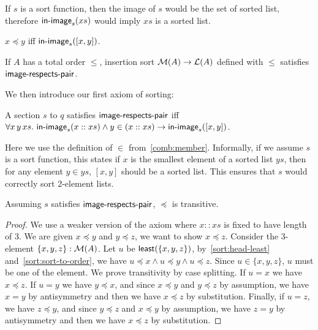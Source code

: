 If $s$ is a sort function, then the image of $s$ would be the set of sorted list, therefore
$\operatorname{\mathsf{in-image}}_s(xs)$ would imply $xs$ is a sorted list.

\begin{proposition}\label{sort:sort-to-order}
    $x \preccurlyeq y$ iff $\operatorname{\mathsf{in-image}}_s([x, y])$.
\end{proposition}

\begin{proposition}
    If $A$ has a total order $\leq$, insertion sort $\mathcal{M}(A) \to \mathcal{L}(A)$ defined with $\leq$
    satisfies $\operatorname{\mathsf{image-respects-pair}}$.
\end{proposition}

\noindent
We then introduce our first axiom of sorting:
\begin{definition}\label{sort:head-least}
    A section $s$ to $q$ satisfies $\operatorname{\mathsf{image-respects-pair}}$ iff
    $\forall x\, y\, xs.\, \operatorname{\mathsf{in-image}}_s(x :: xs) \land y \in (x :: xs) \to \operatorname{\mathsf{in-image}}_s([x,y])$.
\end{definition}
Here we use the definition of $\in$ from~\ref{comb:member}. Informally,
if we assume $s$ is a sort function, this states if
$x$ is the smallest element of a sorted list $ys$, then for any element $y \in ys$,
$[x, y]$ should be a sorted list. This ensures that $s$ would correctly sort 2-element lists.

\begin{proposition}
    Assuming $s$ satisfies $\operatorname{\mathsf{image-respects-pair}}$, $\preccurlyeq$ is transitive.
\end{proposition}
\begin{proof}
    We use a weaker version of the axiom where $x :: xs$ is fixed to have length of 3.
    We are given $x \preccurlyeq y$ and $y \preccurlyeq z$, we want to show $x \preccurlyeq z$.
    Consider the 3-element $\{x,y,z\} : \mathcal{M}(A)$. Let $u$ be $\operatorname{\mathsf{least}}(\{x,y,z\})$,
    by~\ref{sort:head-least} and~\ref{sort:sort-to-order},
    we have $u \preccurlyeq x \land u \preccurlyeq y \land u \preccurlyeq z$.
    Since $u \in \{x,y,z\}$, $u$ must be one of the element. We prove transitivity by case splitting.
    If $u = x$ we have $x \preccurlyeq z$. If $u = y$ we have $y \preccurlyeq x$, and since
    $x \preccurlyeq y$ and $y \preccurlyeq z$ by assumption,
    we have $x = y$ by antisymmetry and then we have $x \preccurlyeq z$ by substitution.
    Finally, if $u = z$, we have $z \preccurlyeq y$, and since
    $y \preccurlyeq z$ and $x \preccurlyeq y$ by assumption,
    we have $z = y$ by antisymmetry and then we have $x \preccurlyeq z$ by substitution.
\end{proof}

